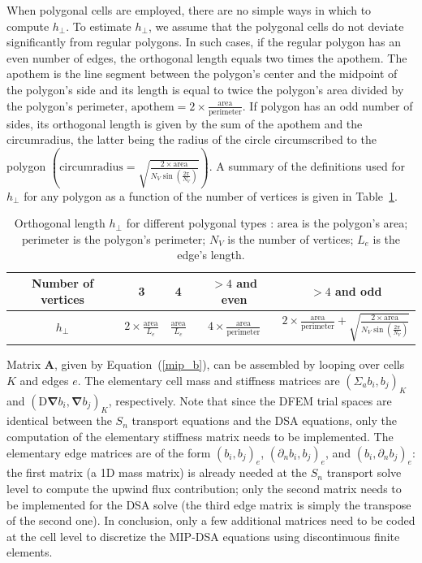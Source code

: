 \documentclass[preprint,10pt]{elsarticle}
\newcommand\grad{\boldsymbol{\nabla}}
\newcommand\bs{\boldsymbol}
\renewcommand{\(}{\left(}
\renewcommand{\)}{\right)}
\renewcommand{\[}{\left[}
\renewcommand{\]}{\right]}
\newcommand{\sn}{\ensuremath{S_n}\xspace}
\begin{document}
%
When polygonal cells are employed, there are no 
simple ways in which to compute $h_{\bot}$. To estimate $h_{\bot}$, we 
assume that the polygonal cells do not deviate significantly from regular polygons. 
In such cases, if the regular polygon has an even number of edges, the orthogonal 
length equals two times the apothem. The apothem is the line segment between the 
polygon's center and the midpoint of the polygon's side and its length is equal to
twice the polygon's area divided by the polygon's perimeter,
$\textrm{apothem}=2\times \tfrac{\textrm{area}}{\textrm{perimeter}}$. 
If polygon has an odd number of sides, its orthogonal length is given by the sum of the
apothem and the circumradius, the latter being the radius of the circle circumscribed to 
the polygon $\(\textrm{circumradius}=\sqrt{\tfrac{2\times \textrm{area}}{N_V
\sin\(\frac{2\pi}{N_V}\)}}\)$. A summary of the definitions used for $h_{\bot}$ for 
any polygon as a function of the number of vertices is given in
Table~\ref {table_h_bot}.
%
\begin{table}[H]
  \begin{center}
    \caption{Orthogonal length $h_{\bot}$ for different polygonal types : 
		$\textrm{area}$ is the polygon's area; $\textrm{perimeter}$ is the polygon's perimeter; 
		$N_V$ is the number of vertices; $L_e $ is the edge's length.}
    \begin{tabular}{|c|c|c|c|c|}
      \hline
      Number of vertices & 3 & 4 & $> 4$ and even & $> 4$ and odd \\
      \hline
      $h_{\bot}$ & $2 \times \frac{\textrm{area}}{L_e}$ &
$\frac{\textrm{area}}{L_e}$ & $4\times
\frac{\textrm{area}}{\textrm{perimeter}}$ & $2 \times
      \frac{\textrm{area}}{\textrm{perimeter}}+\sqrt{\frac{2\times
      \textrm{area}}{N_V\sin\(\frac{2\pi}{N_V}\)}}$\\
      \hline
    \end{tabular}
    \label{table_h_bot}
  \end{center}
\end{table}

Matrix $\bs{A}$, given by Equation~\textup {(\ref {mip_b})}, can be assembled by looping over cells $K$
and edges $e$. The elementary cell mass and stiffness matrices are $\(\Sigma_a b_i,b_j\)_K$
and $(\mathrm{D}\grad b_i,\grad b_j)_K$, respectively. Note that since the DFEM trial spaces
are identical between the \sn transport equations and the DSA equations, only the computation of the
elementary stiffness matrix needs to be implemented. The elementary edge matrices are of the form
$(b_i,b_j)_e$, $(\partial_n b_i,b_j)_e$, and $(b_i,\partial_n b_j)_e$: the first matrix (a 1D mass matrix) 
is already needed at the \sn transport solve level to compute the upwind flux contribution; only the 
second matrix needs to be implemented for the DSA solve (the third edge matrix is simply the transpose of 
the second one). In conclusion, only a few additional matrices need to be coded at the cell level to
discretize the MIP-DSA equations using discontinuous finite elements.
\end{document}
